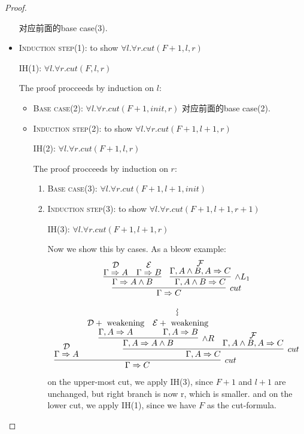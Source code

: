 \documentclass{article}
\theoremstyle{plain}
\newcounter{case}
\theoremstyle{nonumberplain}
\newtheorem{proof}{Proof}
\begin{document}
\begin{proof}
\begin{itemize}
	对应前面的base case(3).
	\item \textsc{Induction step}(1): to show $\forall l. \forall r.cut(F+1,l,r)$
	
	IH(1): $\forall l. \forall r.cut(F,l,r)$
	
	The proof procceeds by induction on $l$:
	
	\begin{itemize}
		\item \textsc{Base case}(2): $\forall l. \forall r.cut(F+1,init,r)$
		对应前面的base case(2).
		\item  \textsc{Induction step}(2): to show $\forall l. \forall r.cut(F+1,l+1,r)$
		
		IH(2): $\forall l. \forall r.cut(F+1,l,r)$
		
		The proof procceeds by induction on $r$:
		
		\begin{enumerate}
			\item \textsc{Base case}(3): $\forall l. \forall r.cut(F+1,l+1,init)$
			
			\item  \textsc{Induction step}(3): to show $\forall l. \forall r.cut(F+1,l+1,r+1)$
			
			IH(3): $\forall l. \forall r.cut(F+1,l+1,r)$
			
			Now we show this by cases.  As a bleow example:
			$$
			\begin{gathered}
\infer[cut]{\Gamma \Rightarrow C}{\infer{\Gamma \Rightarrow A \wedge B}{\deduce{\Gamma \Rightarrow A}{\mathcal{D}} & \deduce{\Gamma \Rightarrow B}{\mathcal{E}}} & \infer[\wedge L_1]{\Gamma, A \wedge B \Rightarrow C}{\deduce{\Gamma, A \wedge B, A \Rightarrow C}{\mathcal{F}}}} \\
\rotatebox{270}{$\leadsto$}\\
\infer[cut]{\Gamma \Rightarrow C}{\deduce{\Gamma \Rightarrow A}{\mathcal{D}} & \infer[cut]{\Gamma, A \Rightarrow C}{ \infer[\wedge R]{\Gamma, A \Rightarrow A \wedge B}{\deduce{\Gamma, A \Rightarrow A}{\mathcal{D}+~\text{weakening}} & \deduce{\Gamma,A \Rightarrow B}{\mathcal{E}+~\text{weakening}}}& \deduce{\Gamma, A \wedge B, A \Rightarrow C}{\mathcal{F}}}}
\end{gathered}
			$$
			on the upper-most cut, we apply IH(3), since $F+1$ and $l+1$ are unchanged, but right branch is now r, which is smaller. and on the lower cut, we apply IH(1), since we have $F$ as the cut-formula.
		\end{enumerate}
	\end{itemize}	 
\end{itemize} 
\end{proof}
\end{document}
